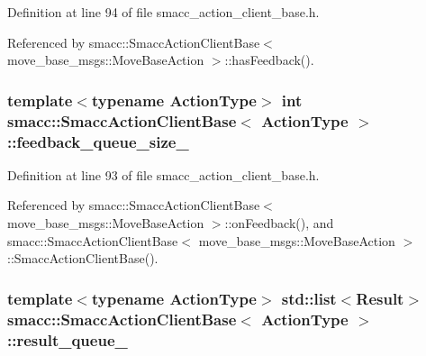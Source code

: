 Definition at line 94 of file smacc\+\_\+action\+\_\+client\+\_\+base.\+h.



Referenced by smacc\+::\+Smacc\+Action\+Client\+Base$<$ move\+\_\+base\+\_\+msgs\+::\+Move\+Base\+Action $>$\+::has\+Feedback().

\subsubsection[{\texorpdfstring{feedback\+\_\+queue\+\_\+size\+\_\+}{feedback_queue_size_}}]{\setlength{\rightskip}{0pt plus 5cm}template$<$typename Action\+Type$>$ {\bf int} {\bf smacc\+::\+Smacc\+Action\+Client\+Base}$<$ Action\+Type $>$\+::feedback\+\_\+queue\+\_\+size\+\_\+\hspace{0.3cm}{\ttfamily [protected]}}\hypertarget{classsmacc_1_1SmaccActionClientBase_a834575fe2be93d0ccada8c1d486c49cd}{}\label{classsmacc_1_1SmaccActionClientBase_a834575fe2be93d0ccada8c1d486c49cd}


Definition at line 93 of file smacc\+\_\+action\+\_\+client\+\_\+base.\+h.



Referenced by smacc\+::\+Smacc\+Action\+Client\+Base$<$ move\+\_\+base\+\_\+msgs\+::\+Move\+Base\+Action $>$\+::on\+Feedback(), and smacc\+::\+Smacc\+Action\+Client\+Base$<$ move\+\_\+base\+\_\+msgs\+::\+Move\+Base\+Action $>$\+::\+Smacc\+Action\+Client\+Base().

\subsubsection[{\texorpdfstring{result\+\_\+queue\+\_\+}{result_queue_}}]{\setlength{\rightskip}{0pt plus 5cm}template$<$typename Action\+Type$>$ std\+::list$<$Result$>$ {\bf smacc\+::\+Smacc\+Action\+Client\+Base}$<$ Action\+Type $>$\+::result\+\_\+queue\+\_\+\hspace{0.3cm}{\ttfamily [protected]}}\hypertarget{classsmacc_1_1SmaccActionClientBase_a42c2e070235e6eeaca970c2abaeabec4}{}\label{classsmacc_1_1SmaccActionClientBase_a42c2e070235e6eeaca970c2abaeabec4}


